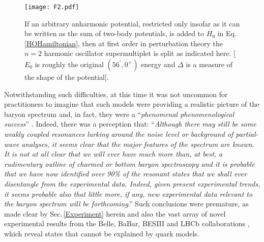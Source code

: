 \begin{figure}[t]
\centerline{\texttt{[image: F2.pdf]}}
\caption{\label{n2splitting}
If an arbitrary anharmonic potential, restricted only insofar as it can be written as the sum of two-body potentials, is added to $H_0$ in Eq.\,\eqref{HOHamiltonian}, then at first order in perturbation theory the $n=2$ harmonic oscillator supermultiplet is split as indicated here.  [$E_0$ is roughly the original $(56^\prime,0^+)$ energy and $\Delta$ is a measure of the shape of the potential].
}
\end{figure}


Notwithstanding such difficulties, at this time it was not uncommon for practitioners to imagine that such models were providing a realistic picture of the baryon spectrum and, in fact, they were a ``\emph{phenomenal phenomenological success}'' \cite{Hey:1982aj}.  Indeed, there was a perception \cite{Hey:1982aj} that: ``\emph{Although there may still be some weakly coupled resonances lurking around the noise level or background of partial-wave analyses, it seems clear that the major features of the spectrum are known. It is not at all clear that we will ever have much more than, at best, a rudimentary outline of charmed or bottom baryon spectroscopy and it is probable that we have now identified over 90\% of the resonant states that we shall ever disentangle from the experimental data.  Indeed, given present experimental trends, it seems probable also that little more, if any, new experimental data relevant to the baryon spectrum will be forthcoming}.''   Such conclusions were premature, as made clear by Sec.\,\ref{Experiment} herein and also the vast array of novel experimental results from the Belle, BaBar, BESIII and LHCb collaborations \cite{BraatenFB21, ChengpingFB21, Aaij:2015tga}, which reveal states that cannot be explained by quark models.

